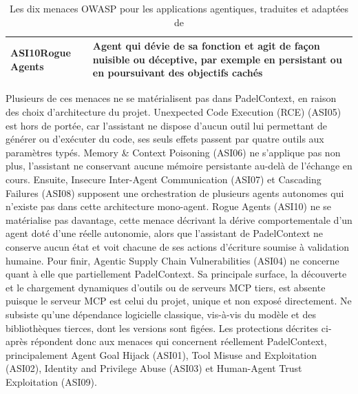 \documentclass[12pt]{article}
\begin{document}
\begin{table}[H]
\begin{tabularx}{\textwidth}{|p{4.1cm}|X|}
    \textbf{ASI10}\newline Rogue Agents & Agent qui dévie de sa fonction et agit de façon nuisible ou déceptive, par exemple en persistant ou en poursuivant des objectifs cachés \\ \hline
    \end{tabularx}
    \caption{Les dix menaces OWASP pour les applications agentiques, traduites et adaptées de \parencite{owasp_owasp_2025}}
    \label{tab:owasp_agentic_top10}
\end{table}

Plusieurs de ces menaces ne se matérialisent pas dans PadelContext, en raison des choix d'architecture du projet. 
\newline\newline
Unexpected Code Execution (RCE) (ASI05) est hors de portée, car l'assistant ne dispose d'aucun outil lui permettant de générer ou d'exécuter du code, ses seuls effets passent par quatre outils aux paramètres typés. Memory \& Context Poisoning (ASI06) ne s'applique pas non plus, l'assistant ne conservant aucune mémoire persistante au-delà de l'échange en cours. Ensuite, Insecure Inter-Agent Communication (ASI07) et Cascading Failures (ASI08) supposent une orchestration de plusieurs agents autonomes qui n'existe pas dans cette architecture mono-agent. Rogue Agents (ASI10) ne se matérialise pas davantage, cette menace décrivant la dérive comportementale d'un agent doté d'une réelle autonomie, alors que l'assistant de PadelContext ne conserve aucun état et voit chacune de ses actions d'écriture soumise à validation humaine. Pour finir, Agentic Supply Chain Vulnerabilities (ASI04) ne concerne quant à elle que partiellement PadelContext. Sa principale surface, la découverte et le chargement dynamiques d'outils ou de serveurs MCP tiers, est absente puisque le serveur MCP est celui du projet, unique et non exposé directement. Ne subsiste qu'une dépendance logicielle classique, vis-à-vis du modèle et des bibliothèques tierces, dont les versions sont figées.
\newline\newline
Les protections décrites ci-après répondent donc aux menaces qui concernent réellement PadelContext, principalement Agent Goal Hijack (ASI01), Tool Misuse and Exploitation (ASI02), Identity and Privilege Abuse (ASI03) et Human-Agent Trust Exploitation (ASI09).
\end{document}
